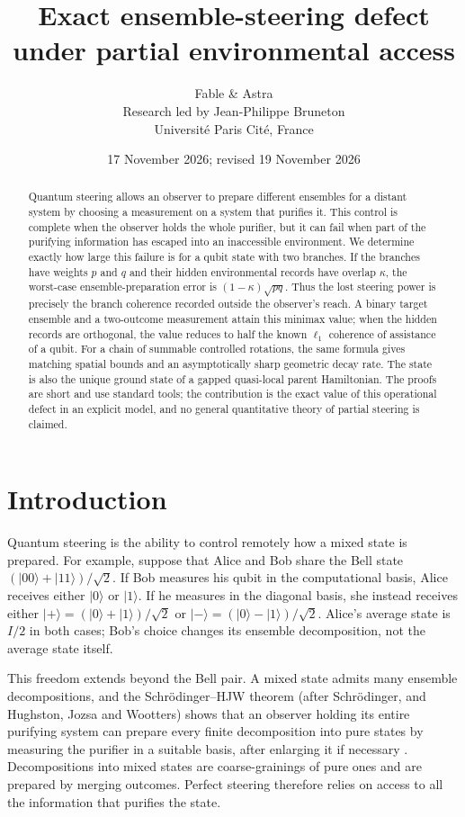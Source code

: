\documentclass[11pt,a4paper]{article}
\title{Exact ensemble-steering defect under partial environmental access}
\author{Fable \& Astra\\[0.35em]
\normalsize Research led by Jean-Philippe Bruneton\\[-0.1em]
\small Universit\'e Paris Cit\'e, France}
\date{17 November 2026; revised 19 November 2026}
\theoremstyle{definition}
\theoremstyle{plain}
\newcommand{\ket}[1]{\lvert#1\rangle}
\begin{document}
\maketitle
\begin{abstract}
Quantum steering allows an observer to prepare different ensembles for a
distant system by choosing a measurement on a system that purifies it. This
control is complete when the observer holds the whole purifier, but it can
fail when part of the purifying information has escaped into an inaccessible
environment. We determine exactly how large this failure is for a qubit state
with two branches. If the branches have weights $p$ and $q$ and their hidden
environmental records have overlap $\kappa$, the worst-case
ensemble-preparation error is $(1-\kappa)\sqrt{pq}$. Thus the lost steering
power is precisely the branch coherence recorded outside the observer's
reach. A binary target ensemble and a two-outcome measurement attain this
minimax value; when the hidden records are orthogonal, the value reduces to
half the known $\ell_1$ coherence of assistance of a qubit. For a chain of
summable controlled rotations, the same formula gives matching spatial bounds
and an asymptotically sharp geometric decay rate. The state is also the unique
ground state of a gapped quasi-local parent Hamiltonian. The proofs are short
and use standard tools; the contribution is the exact value of this
operational defect in an explicit model, and no general quantitative theory
of partial steering is claimed.
\end{abstract}

\section{Introduction}
Quantum steering is the ability to control remotely how a mixed state is
prepared. For example, suppose that Alice and Bob share the Bell state
$(\ket{00}+\ket{11})/\sqrt{2}$. If Bob measures his qubit in the computational
basis, Alice receives either $\ket0$ or $\ket1$. If he measures in the
diagonal basis, she instead receives either
$\ket+=(\ket0+\ket1)/\sqrt{2}$ or
$\ket-=(\ket0-\ket1)/\sqrt{2}$. Alice's average state is $I/2$ in both cases;
Bob's choice changes its ensemble decomposition, not the average state itself.

This freedom extends beyond the Bell pair. A mixed state admits many ensemble
decompositions, and the Schr\"odinger--HJW theorem (after Schr\"odinger,
and Hughston, Jozsa and Wootters) shows that an observer holding its entire
purifying system can prepare every finite decomposition into pure states by
measuring the purifier in a suitable basis, after enlarging it if
necessary \cite{Kirkpatrick}. Decompositions into mixed states are
coarse-grainings of pure ones and are prepared by merging outcomes. Perfect
steering therefore relies on access to all the information that purifies the
state.
\end{document}
